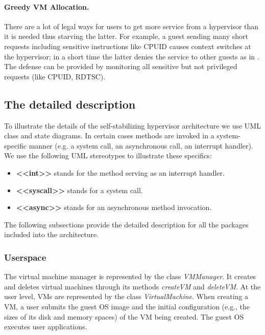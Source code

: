 \paragraph{Greedy VM Allocation. }

There are a lot of legal ways for users to get more service from a
hypervisor than it is needed thus starving the latter. For example,
a guest sending many short requests including sensitive instructions
like CPUID causes context switches at the hypervisor; in a short time
the latter denies the service to other guests as in \cite{ddos-cpuid}.
The defense can be provided by monitoring all sensitive but not privileged
requests (like CPUID, RDTSC).


\subsection{The detailed description }

To illustrate the details of the self-stabilizing hypervisor architecture
we use UML class and state diagrams. In certain cases methods are
invoked in a system-specific manner (e.g. a system call, an asynchronous
call, an interrupt handler). We use the following UML stereotypes
to illustrate these specifics:
\begin{itemize}
\item \textbf{<\textcompwordmark{}<int>\textcompwordmark{}>} stands for
the method serving as an interrupt handler. 
\item \textbf{<\textcompwordmark{}<syscall>\textcompwordmark{}>} stands
for a system call. 
\item \textbf{<\textcompwordmark{}<async>\textcompwordmark{}>} stands for
an asynchronous method invocation. 
\end{itemize}
The following subsections provide the detailed description for all
the packages included into the architecture.


\subsubsection{Userspace}

The virtual machine manager is represented by the class \textit{VMManager}.
It creates and deletes virtual machines through its methods \textit{createVM}
and \textit{deleteVM}. At the user level, VMs are represented by the
class \textit{VirtualMachine}. When creating a VM, a user submits
the guest OS image and the initial configuration (e.g., the sizes
of its disk and memory spaces) of the VM being created. The guest
OS executes user applications.

